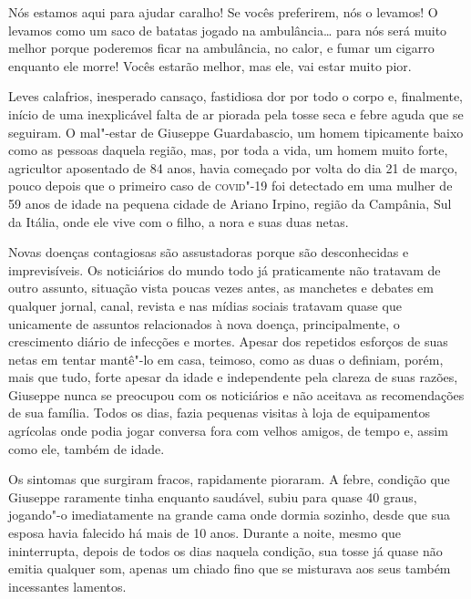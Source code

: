 

\epigraph{Nós estamos aqui para ajudar caralho! Se vocês preferirem, nós o
levamos! O levamos como um saco de batatas jogado na ambulância\ldots{} para
nós será muito melhor porque poderemos ficar na ambulância, no calor, e
fumar um cigarro enquanto ele morre! Vocês estarão melhor, mas ele, vai
estar muito pior.}{}

\noindent{}Leves calafrios, inesperado cansaço, fastidiosa dor por todo o corpo e,
finalmente, início de uma inexplicável falta de ar piorada pela tosse
seca e febre aguda que se seguiram. O mal"-estar de Giuseppe
Guardabascio, um homem tipicamente baixo como as pessoas daquela região,
mas, por toda a vida, um homem muito forte, agricultor aposentado de 84
anos, havia começado por volta do dia 21 de março, pouco depois que o
primeiro caso de \textsc{covid}"-19 foi detectado em uma mulher de 59 anos de
idade na pequena cidade de Ariano Irpino, região da Campânia, Sul da
Itália, onde ele vive com o filho, a nora e suas duas netas.

Novas doenças contagiosas são assustadoras porque são desconhecidas e
imprevisíveis. Os noticiários do mundo todo já praticamente não tratavam
de outro assunto, situação vista poucas vezes antes, as manchetes e
debates em qualquer jornal, canal, revista e nas mídias sociais tratavam
quase que unicamente de assuntos relacionados à nova doença,
principalmente, o crescimento diário de infecções e mortes. Apesar dos
repetidos esforços de suas netas em tentar mantê"-lo em casa, teimoso,
como as duas o definiam, porém, mais que tudo, forte apesar da idade e
independente pela clareza de suas razões, Giuseppe nunca se preocupou
com os noticiários e não aceitava as recomendações de sua família. Todos
os dias, fazia pequenas visitas à loja de equipamentos agrícolas onde
podia jogar conversa fora com velhos amigos, de tempo e, assim como ele,
também de idade.

Os sintomas que surgiram fracos, rapidamente pioraram. A febre, condição
que Giuseppe raramente tinha enquanto saudável, subiu para quase 40
graus, jogando"-o imediatamente na grande cama onde dormia sozinho, desde
que sua esposa havia falecido há mais de 10 anos. Durante a noite, mesmo
que ininterrupta, depois de todos os dias naquela condição, sua tosse já
quase não emitia qualquer som, apenas um chiado fino que se misturava
aos seus também incessantes lamentos.

